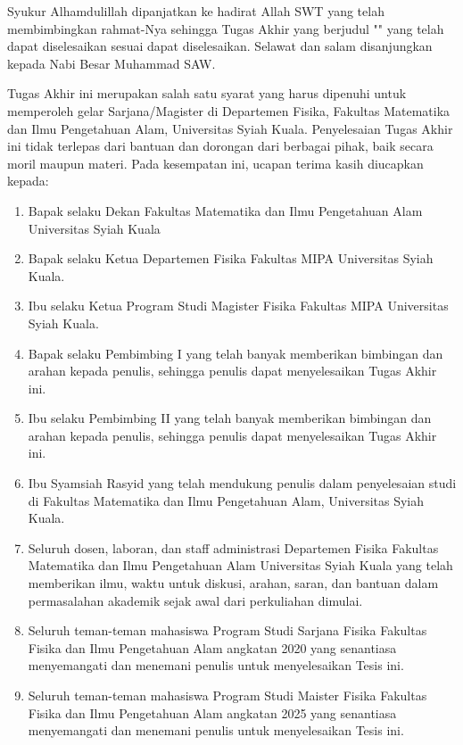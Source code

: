 \preface %
\makeatletter
Syukur Alhamdulillah dipanjatkan ke hadirat Allah SWT yang telah membimbingkan rahmat-Nya sehingga Tugas Akhir yang berjudul "\textit{\@judul}" yang telah dapat diselesaikan sesuai dapat diselesaikan. Selawat dan salam disanjungkan kepada Nabi Besar Muhammad SAW.

Tugas Akhir ini merupakan salah satu syarat yang harus dipenuhi untuk memperoleh gelar Sarjana/Magister di Departemen Fisika, Fakultas Matematika dan Ilmu Pengetahuan Alam, Universitas Syiah Kuala. Penyelesaian Tugas Akhir ini tidak terlepas dari bantuan dan dorongan dari berbagai pihak, baik secara moril maupun materi. Pada kesempatan ini, ucapan terima kasih diucapkan kepada:

\begin{enumerate}
    \item Bapak \@dekan \textit{ }selaku Dekan Fakultas Matematika dan Ilmu Pengetahuan Alam Universitas Syiah Kuala
    \item Bapak \@kajur \textit{ }selaku Ketua Departemen Fisika Fakultas MIPA Universitas Syiah Kuala.
    \item Ibu \@kaprodi \textit{ }selaku Ketua Program Studi Magister Fisika Fakultas MIPA Universitas Syiah Kuala.
    \item Bapak \@firstsupervisor \textit{ }selaku  Pembimbing I yang telah banyak memberikan bimbingan dan arahan kepada penulis, sehingga penulis dapat menyelesaikan Tugas Akhir ini.
    \item Ibu \@secondsupervisor   \textit{ }selaku  Pembimbing II yang telah banyak memberikan bimbingan dan arahan kepada penulis, sehingga penulis dapat menyelesaikan Tugas Akhir ini.
    \item Ibu Syamsiah Rasyid yang telah mendukung penulis dalam penyelesaian studi di Fakultas Matematika dan Ilmu Pengetahuan Alam, Universitas Syiah Kuala.
    \item Seluruh dosen, laboran, dan staff administrasi Departemen Fisika Fakultas Matematika dan Ilmu Pengetahuan Alam Universitas Syiah Kuala yang telah memberikan ilmu, waktu untuk diskusi, arahan, saran, dan bantuan dalam permasalahan akademik sejak awal dari perkuliahan dimulai.
    \item Seluruh teman-teman mahasiswa Program Studi Sarjana Fisika Fakultas Fisika dan Ilmu Pengetahuan Alam angkatan 2020 yang senantiasa menyemangati dan menemani penulis untuk menyelesaikan Tesis ini.
    \item Seluruh teman-teman mahasiswa Program Studi Maister Fisika Fakultas Fisika dan Ilmu Pengetahuan Alam angkatan 2025 yang senantiasa menyemangati dan menemani penulis untuk menyelesaikan Tesis ini.
\end{enumerate}

